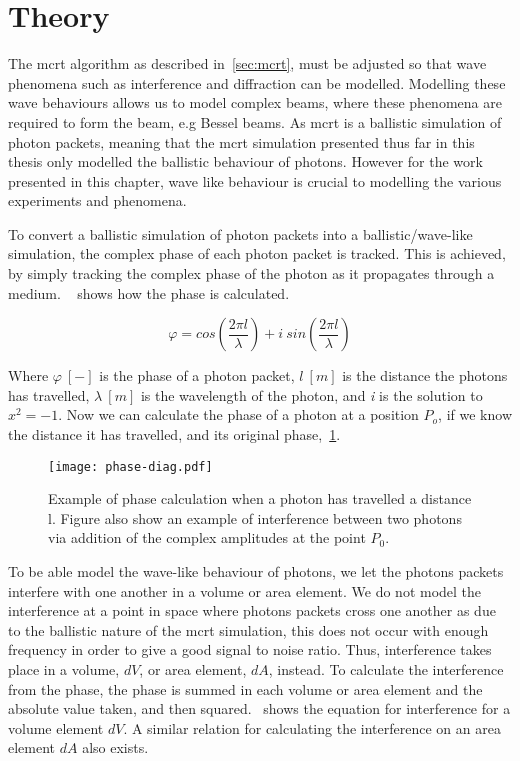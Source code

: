 

\section{Theory}\label{sec:bestheory}

The \gls*{mcrt} algorithm as described in~\cref{sec:mcrt}, must be adjusted so that wave phenomena such as interference and diffraction can be modelled. 
Modelling these wave behaviours allows us to model complex beams, where these phenomena are required to form the beam, e.g Bessel beams. 
As \gls*{mcrt} is a ballistic simulation of photon packets, meaning that the \gls*{mcrt} simulation presented thus far in this thesis only modelled the ballistic behaviour of photons. 
However for the work presented in this chapter, wave like behaviour is crucial to modelling the various experiments and phenomena.

To convert a ballistic simulation of photon packets into a ballistic/wave-like simulation, the complex phase of each photon packet is tracked.
This is achieved, by simply tracking the complex phase of the photon as it propagates through a medium.
~ shows how the phase is calculated.

\begin{equation}
    \varphi = cos\left(\frac{2 \pi l}{\lambda}\right) + i\ sin\left(\frac{2 \pi l}{\lambda}\right)
    \label{eqn:phase}
\end{equation}

Where $\varphi~[-]$ is the phase of a photon packet, $l\ [m]$ is the distance the photons has travelled, $\lambda~[m]$ is the wavelength of the photon, and \textit{i} is the solution to $x^2=-1$.
Now we can calculate the phase of a photon at a position $P_o$, if we know the distance it has travelled, and its original phase,~\cref{fig:phase-diag}.

\begin{figure}[!ht]
    \centering
    \texttt{[image: phase-diag.pdf]}
    \caption{Example of phase calculation when a photon has travelled a distance l. Figure also show an example of interference between two photons via addition of the complex amplitudes at the point $P_0$.}
    \label{fig:phase-diag}
\end{figure}

To be able model the wave-like behaviour of photons, we let the photons packets interfere with one another in a volume or area element. 
We do not model the interference at a point in space where photons packets cross one another as due to the ballistic nature of the \gls*{mcrt} simulation, this does not occur with enough frequency in order to give a good signal to noise ratio. 
Thus, interference takes place in a volume, $dV$, or area element, $dA$, instead.
To calculate the interference from the phase, the phase is summed in each volume or area element and the absolute value taken, and then squared.~ shows the equation for interference for a volume element $dV$. A similar relation for calculating the interference on an area element $dA$ also exists.

